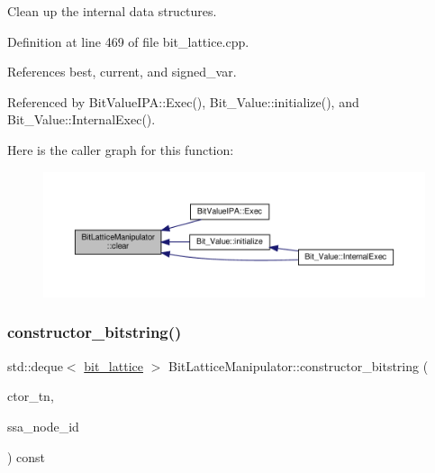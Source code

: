 Clean up the internal data structures. 



Definition at line 469 of file bit\+\_\+lattice.\+cpp.



References best, current, and signed\+\_\+var.



Referenced by Bit\+Value\+I\+P\+A\+::\+Exec(), Bit\+\_\+\+Value\+::initialize(), and Bit\+\_\+\+Value\+::\+Internal\+Exec().

Here is the caller graph for this function\+:
\nopagebreak
\begin{figure}[H]
\begin{center}
\leavevmode
\includegraphics[width=350pt]{dd/d98/classBitLatticeManipulator_a42eb6c4e6540a538398764f35761dbe3_icgraph}
\end{center}
\end{figure}
\mbox{\label{classBitLatticeManipulator_aa0f6e165b5ecfb6894eaa75275cbb58b}} 
\subsubsection{\texorpdfstring{constructor\+\_\+bitstring()}{constructor\_bitstring()}}
{\footnotesize\ttfamily std\+::deque$<$ \hyperlink{bit__lattice_8hpp_ab732360111c810c4eaeb4c8b81d160d6}{bit\+\_\+lattice} $>$ Bit\+Lattice\+Manipulator\+::constructor\+\_\+bitstring (\begin{DoxyParamCaption}\item[{const \hyperlink{tree__node_8hpp_a6ee377554d1c4871ad66a337eaa67fd5}{tree\+\_\+node\+Ref} \&}]{ctor\+\_\+tn,  }\item[{unsigned int}]{ssa\+\_\+node\+\_\+id }\end{DoxyParamCaption}) const\hspace{0.3cm}{\ttfamily [protected]}}



